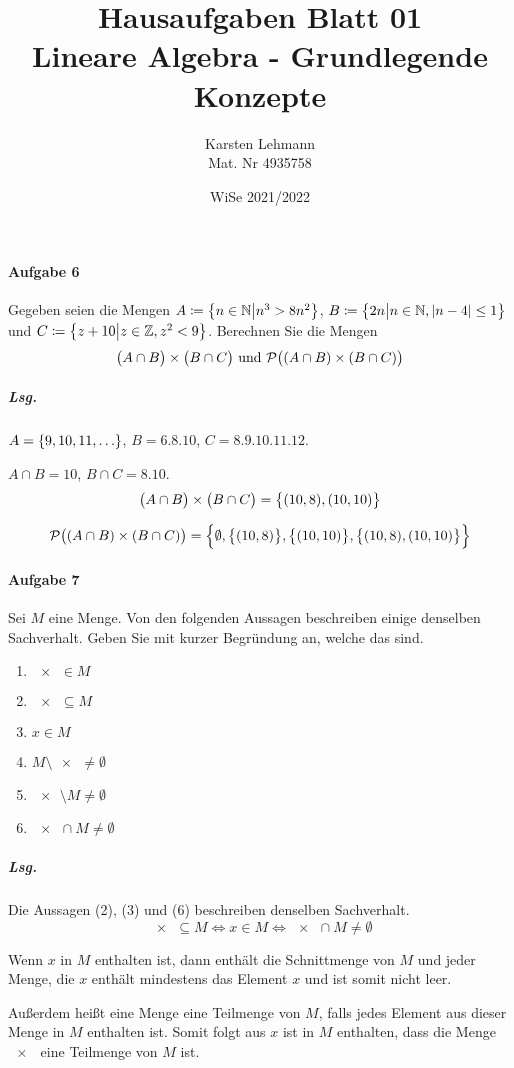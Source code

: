 \documentclass{scrreprt}
\author{Karsten Lehmann\\Mat. Nr 4935758}
\date{WiSe 2021/2022}
\title{Hausaufgaben Blatt 01\\Lineare Algebra - Grundlegende Konzepte}
\begin{document}
\paragraph{Aufgabe 6} Gegeben seien die Mengen
$A \coloneqq \qty\big{n \in \mathbb{N} {\big |} n^3 > 8n^2}$,
$B \coloneqq \qty\big{2n {\big |} n \in \mathbb{N}, \abs{n - 4} \leq 1}$
und $C \coloneqq \qty\big{z + 10 {\big |} z \in \mathbb{Z}, z^2 < 9}$.
Berechnen Sie die Mengen
\[
  \qty\big(A \cap B) \times \qty\big(B \cap C) \text{ und }
  \mathcal{P}\qty\big(\qty(A \cap B) \times (B \cap C))
\]

\subparagraph{Lsg.}
$A = \qty{9, 10, 11, \ldots}$,
$B = \qty{6, 8, 10}$,
$C = \qty{8, 9, 10, 11, 12}$.

$A \cap B = \qty{10}$, $B \cap C = \qty{8, 10}$.
\[
  \qty\big(A \cap B) \times \qty\big(B \cap C) = \qty\big{(10, 8), (10, 10)}
\]

\[
  \mathcal{P}\qty\big(\qty(A \cap B) \times (B \cap C)) =
  \qty\Big{
    \emptyset,
    \qty\big{\qty(10, 8)}, \qty\big{\qty(10, 10)},
    \qty\big{\qty(10, 8), \qty(10, 10)}
  }
\]

\paragraph{Aufgabe 7} Sei $M$ eine Menge.
Von den folgenden Aussagen beschreiben einige denselben Sachverhalt.
Geben Sie mit kurzer Begründung an, welche das sind.
\begin{multicols}{3}
  \begin{enumerate}[(1)]
  \item $\qty{x} \in M$
  \item $\qty{x} \subseteq M$
  \item $x \in M$
  \item $M \setminus \qty{x} \ne \emptyset$
  \item $\qty{x} \setminus M \ne \emptyset$
  \item $\qty{x} \cap M \ne \emptyset$
  \end{enumerate}
\end{multicols}

\subparagraph{Lsg.} Die Aussagen (2), (3) und (6) beschreiben denselben
Sachverhalt.
\[
  \qty{x} \subseteq M \iff x \in M \iff \qty{x} \cap M \ne \emptyset
\]

Wenn $x$ in $M$ enthalten ist, dann enthält die Schnittmenge von $M$ und
jeder Menge, die $x$ enthält mindestens das Element $x$ und ist somit nicht
leer.

Außerdem heißt eine Menge eine Teilmenge von $M$, falls jedes Element aus dieser
Menge in $M$ enthalten ist.
Somit folgt aus $x$ ist in $M$ enthalten, dass die Menge $\qty{x}$ eine Teilmenge
von $M$ ist.
\end{document}
